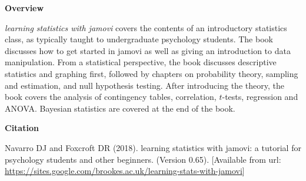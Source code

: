 

\clearpage
\newpage
\begin{center}
{\bf Overview}
\end{center}

\noindent
{\it learning statistics with jamovi} covers the contents of an introductory statistics class, as typically taught to undergraduate psychology students. The book discusses how to get started in jamovi as well as giving an introduction to data manipulation. From a statistical perspective, the book discusses descriptive statistics and graphing first, followed by chapters on probability theory, sampling and estimation, and null hypothesis testing. After introducing the theory, the book covers the analysis of contingency tables, correlation, $t$-tests, regression and ANOVA. Bayesian statistics are covered at the end of the book. 

\vspace{14cm}
\begin{center}
{\bf Citation}
\end{center}

\noindent
Navarro DJ and Foxcroft DR (2018). learning statistics with jamovi: a tutorial for psychology students and other beginners. (Version 0.65). [Available from url: \url{https://sites.google.com/brookes.ac.uk/learning-stats-with-jamovi}]